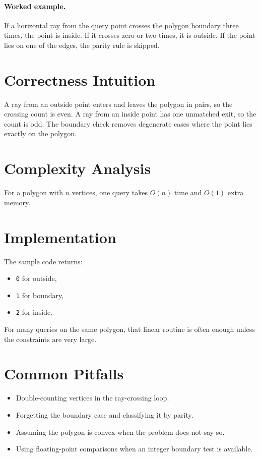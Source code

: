 \paragraph{Worked example.}
If a horizontal ray from the query point crosses the polygon boundary three times, the point is inside. If it crosses
zero or two times, it is outside. If the point lies on one of the edges, the parity rule is skipped.

\section*{Correctness Intuition}

A ray from an outside point enters and leaves the polygon in pairs, so the crossing count is even. A ray from an
inside point has one unmatched exit, so the count is odd. The boundary check removes degenerate cases where the point
lies exactly on the polygon.

\section*{Complexity Analysis}

For a polygon with \(n\) vertices, one query takes \(O(n)\) time and \(O(1)\) extra memory.

\section*{Implementation}

The sample code returns:

\begin{itemize}
  \item \texttt{0} for outside,
  \item \texttt{1} for boundary,
  \item \texttt{2} for inside.
\end{itemize}

For many queries on the same polygon, that linear routine is often enough unless the constraints are very large.

\section*{Common Pitfalls}

\begin{itemize}
  \item Double-counting vertices in the ray-crossing loop.
  \item Forgetting the boundary case and classifying it by parity.
  \item Assuming the polygon is convex when the problem does not say so.
  \item Using floating-point comparisons when an integer boundary test is available.
\end{itemize}


